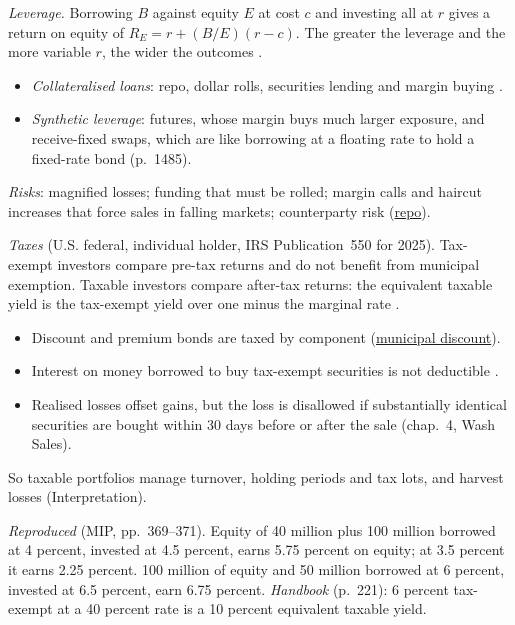 \begin{qfmethod}\label{meth:bond-leverage-taxation}
 \emph{Leverage.} Borrowing $B$ against equity $E$ at cost $c$ and investing all at $r$ gives a return on equity of $R_E=r+(B/E)(r-c)$. The greater the leverage and the more variable $r$, the wider the outcomes \citep[chap.~6, sec.~5.2, pp.~369--373]{managing-investment-portfolios-2007}.
\begin{itemize}
\item \emph{Collateralised loans}: repo, dollar rolls, securities lending and margin buying \citep[chap.~60, pp.~1485--1491]{s7-fabozzifixed}.
\item \emph{Synthetic leverage}: futures, whose margin buys much larger exposure, and receive-fixed swaps, which are like borrowing at a floating rate to hold a fixed-rate bond (p.~1485).
\end{itemize}
\emph{Risks}: magnified losses; funding that must be rolled; margin calls and haircut increases that force sales in falling markets; counterparty risk (\hyperref[def:short-term-funding-repo]{repo}).

\emph{Taxes} (U.S. federal, individual holder, IRS Publication~550 for 2025). Tax-exempt investors compare pre-tax returns and do not benefit from municipal exemption. Taxable investors compare after-tax returns: the equivalent taxable yield is the tax-exempt yield over one minus the marginal rate \citep[chap.~9, p.~221]{s7-fabozzifixed}.
\begin{itemize}
\item Discount and premium bonds are taxed by component (\hyperref[rule:bond-issuance-legal-tax]{municipal discount}).
\item Interest on money borrowed to buy tax-exempt securities is not deductible \citep[chap.~3, Tax-exempt income]{irs-pub-550-2025}.
\item Realised losses offset gains, but the loss is disallowed if substantially identical securities are bought within 30 days before or after the sale (chap.~4, Wash Sales).
\end{itemize}
So taxable portfolios manage turnover, holding periods and tax lots, and harvest losses (Interpretation).

 \emph{Reproduced} (MIP, pp.~369--371). Equity of 40 million plus 100 million borrowed at 4 percent, invested at 4.5 percent, earns 5.75 percent on equity; at 3.5 percent it earns 2.25 percent. 100 million of equity and 50 million borrowed at 6 percent, invested at 6.5 percent, earn 6.75 percent. \emph{Handbook} (p.~221): 6 percent tax-exempt at a 40 percent rate is a 10 percent equivalent taxable yield.


\end{qfmethod}
